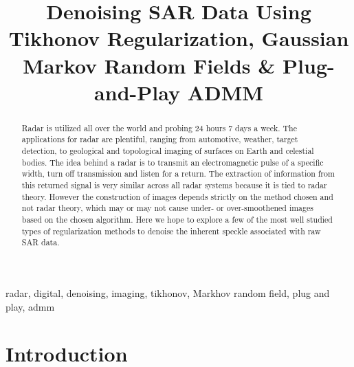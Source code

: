 \documentclass[conference]{IEEEtran}
\begin{document}
\title{Denoising SAR Data Using Tikhonov Regularization, Gaussian Markov Random Fields \& Plug-and-Play ADMM\\
}

\author{

}

\maketitle
\begin{abstract}
\par Radar is utilized all over the world and probing 24 hours 7 days a week. The applications for radar are plentiful, ranging from automotive, weather, target detection, to geological and topological imaging of surfaces on Earth and celestial bodies. The idea behind a radar is to transmit an electromagnetic pulse of a specific width, turn off transmission and listen for a return. The extraction of information from this returned signal is very similar across all radar systems because it is tied to radar theory. However the construction of images depends strictly on the method chosen and not radar theory, which may or may not cause under- or over-smoothened images based on the chosen algorithm. Here we hope to explore a few of the most well studied types of regularization methods to denoise the inherent speckle associated with raw SAR data.
\end{abstract}

\begin{IEEEkeywords}
radar, digital, denoising, imaging, tikhonov, Markhov random field, plug and play, admm
\end{IEEEkeywords}
\section{Introduction}
\end{document}
